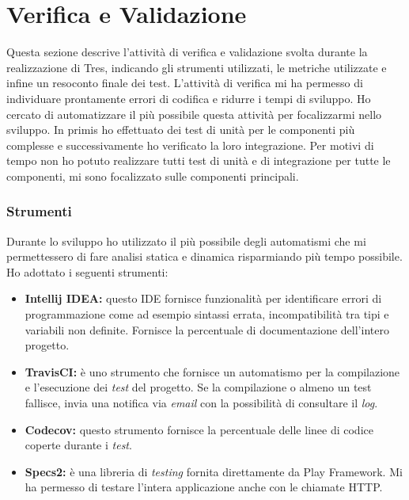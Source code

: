 \section{Verifica e Validazione}
Questa sezione descrive l'attività di verifica e validazione svolta durante la realizzazione di Tres, indicando gli strumenti utilizzati, le metriche utilizzate e infine un resoconto finale dei test. L'attività di verifica mi ha permesso di individuare prontamente errori di codifica e ridurre i tempi di sviluppo. Ho cercato di automatizzare il più possibile questa attività per focalizzarmi nello sviluppo. In primis ho effettuato dei test di unità per le componenti più complesse e successivamente ho verificato la loro integrazione. Per motivi di tempo non ho potuto realizzare tutti test di unità e di integrazione per tutte le componenti, mi sono focalizzato sulle componenti principali. 
\subsubsection{Strumenti}
Durante lo sviluppo ho utilizzato il più possibile degli automatismi che mi permettessero di fare analisi statica e dinamica risparmiando più tempo possibile. Ho adottato i seguenti strumenti:
\begin{itemize}
\item \textbf{Intellij IDEA:} questo IDE fornisce funzionalità per identificare errori di programmazione come ad esempio sintassi errata, incompatibilità tra tipi e variabili non definite. Fornisce la percentuale di documentazione dell'intero progetto.
\item \textbf{TravisCI:} è uno strumento che fornisce un automatismo per la compilazione e l'esecuzione dei \emph{test} del progetto. Se la compilazione o almeno un test fallisce, invia una notifica via \emph{email} con la possibilità di consultare il \emph{log}.
\item \textbf{Codecov:} questo strumento fornisce la percentuale delle linee di codice coperte durante i \emph{test}.
\item \textbf{Specs2:} è una libreria di \emph{testing} fornita direttamente da Play Framework. Mi ha permesso di testare l'intera applicazione anche con le chiamate HTTP.
\end{itemize}
\newpage
